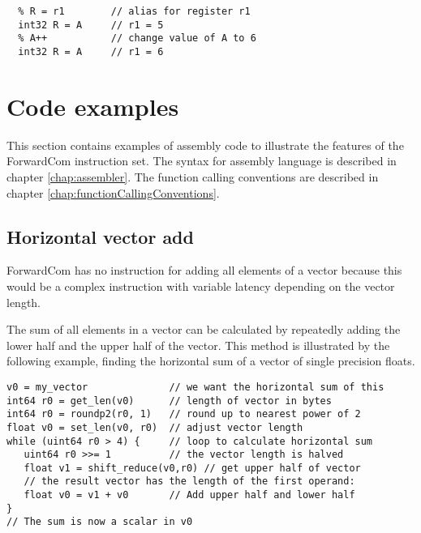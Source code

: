 \documentclass[forwardcom.tex]{subfiles}
\begin{document}
\begin{lstlisting}[frame=single]
  % A = 5         // meta-variable integer A = 5
  % R = r1        // alias for register r1
  int32 R = A     // r1 = 5
  % A++           // change value of A to 6
  int32 R = A     // r1 = 6
\end{lstlisting}
\vv



\section{Code examples}\label{chap:codeExamples}

This section contains examples of assembly code to illustrate the features of the ForwardCom instruction set.
The syntax for assembly language is described in chapter \ref{chap:assembler}.
The function calling conventions are described in chapter \ref{chap:functionCallingConventions}.
\vv


\subsection{Horizontal vector add} \label{horizontalVectorAdd}
ForwardCom has no instruction for adding all elements of a vector because this would be a complex instruction with variable latency depending on the vector length.
\vv

The sum of all elements in a vector can be calculated by repeatedly adding the lower half and the upper half of the vector. This method is illustrated by the following example, finding the horizontal sum of a vector of single precision floats. 

\begin{example}
\label{exampleHorizontalAdd}
\end{example} %
\begin{lstlisting}[frame=single]
v0 = my_vector              // we want the horizontal sum of this
int64 r0 = get_len(v0)      // length of vector in bytes
int64 r0 = roundp2(r0, 1)   // round up to nearest power of 2
float v0 = set_len(v0, r0)  // adjust vector length
while (uint64 r0 > 4) {     // loop to calculate horizontal sum
   uint64 r0 >>= 1          // the vector length is halved
   float v1 = shift_reduce(v0,r0) // get upper half of vector
   // the result vector has the length of the first operand:
   float v0 = v1 + v0       // Add upper half and lower half
}
// The sum is now a scalar in v0
\end{lstlisting}
\vspace{4mm}
\end{document}
